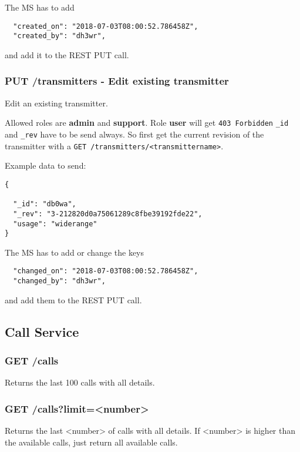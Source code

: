 The MS has to add 
\begin{lstlisting}
  "created_on": "2018-07-03T08:00:52.786458Z",
  "created_by": "dh3wr",
\end{lstlisting}
and add it to the REST PUT call.


\subsubsection{PUT /transmitters - Edit existing transmitter}
Edit an existing transmitter.\\

Allowed roles are \textbf{admin} and \textbf{support}. Role \textbf{user} will get \verb|403 Forbidden|
\verb|_id| and \verb|_rev| have to be send always. So first get the current revision of the transmitter with a \verb|GET /transmitters/<transmittername>|.

Example data to send:
\begin{lstlisting}
{

  "_id": "db0wa",
  "_rev": "3-212820d0a75061289c8fbe39192fde22",
  "usage": "widerange"
}
\end{lstlisting}

The MS has to add or change the keys
\begin{lstlisting}
  "changed_on": "2018-07-03T08:00:52.786458Z",
  "changed_by": "dh3wr",
\end{lstlisting}
and add them to the REST PUT call.

\subsection{Call Service}

\subsubsection{GET /calls}
Returns the last 100 calls with all details.

\subsubsection{GET /calls?limit=<number>}

Returns the last <number> of calls with all details. If <number> is higher than the available calls, just return all available calls.

